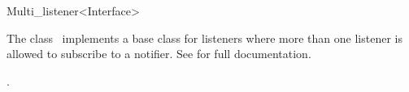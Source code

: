 

\begin{ccRefClass}{Multi_listener<Interface>}  %


\ccDefinition
  
The class \ccRefName\ implements a base class for listeners where more than one listener is allowed to subscribe to a notifier. See  for full documentation.


\ccSeeAlso

.

\end{ccRefClass}


